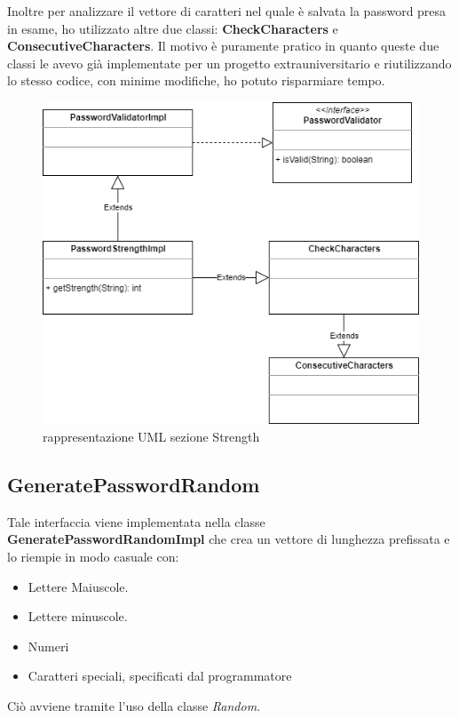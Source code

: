 \documentclass[a4paper,12pt]{report}
\begin{document}
Inoltre per analizzare il vettore di caratteri nel quale è salvata la password presa in esame, ho utilizzato altre due classi: \textbf{CheckCharacters} e \textbf{ConsecutiveCharacters}. Il motivo è puramente pratico in quanto queste due classi le avevo già implementate per un progetto extrauniversitario e riutilizzando lo stesso codice, con minime modifiche, ho potuto risparmiare tempo.
\clearpage
\begin{figure}[h]
\centering{}
\includegraphics[width=\textwidth]{password-strength}
\caption{rappresentazione UML sezione Strength}
\end{figure}

\subsection*{GeneratePasswordRandom}
Tale interfaccia viene implementata nella classe \textbf{GeneratePasswordRandomImpl} che crea un vettore di lunghezza prefissata e lo riempie in modo casuale con:
\begin{itemize}
  \item Lettere Maiuscole.
  \item Lettere minuscole.
  \item Numeri
  \item Caratteri speciali, specificati dal programmatore
\end{itemize}
Ciò avviene tramite l’uso della classe \textit{Random}.\\
\end{document}
